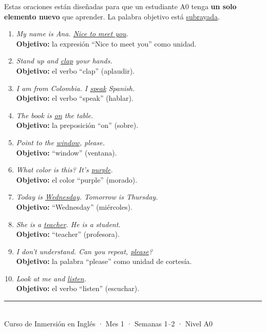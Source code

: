 \documentclass[12pt,a4paper]{article}
\begin{document}
\begin{cajamineria}
Estas oraciones están diseñadas para que un estudiante A0 tenga \textbf{un solo elemento nuevo} que aprender. La palabra objetivo está \underline{subrayada}.

\medskip
\begin{enumerate}[leftmargin=1.2cm]
  \item \textit{My name is Ana. \underline{Nice to meet you}.}\\
    {\small\textbf{Objetivo:} la expresión ``Nice to meet you'' como unidad.}

  \item \textit{Stand up and \underline{clap} your hands.}\\
    {\small\textbf{Objetivo:} el verbo ``clap'' (aplaudir).}

  \item \textit{I am from Colombia. I \underline{speak} Spanish.}\\
    {\small\textbf{Objetivo:} el verbo ``speak'' (hablar).}

  \item \textit{The book is \underline{on} the table.}\\
    {\small\textbf{Objetivo:} la preposición ``on'' (sobre).}

  \item \textit{Point to the \underline{window}, please.}\\
    {\small\textbf{Objetivo:} ``window'' (ventana).}

  \item \textit{What color is this? It's \underline{purple}.}\\
    {\small\textbf{Objetivo:} el color ``purple'' (morado).}

  \item \textit{Today is \underline{Wednesday}. Tomorrow is Thursday.}\\
    {\small\textbf{Objetivo:} ``Wednesday'' (miércoles).}

  \item \textit{She is a \underline{teacher}. He is a student.}\\
    {\small\textbf{Objetivo:} ``teacher'' (profesora).}

  \item \textit{I don't understand. Can you repeat, \underline{please}?}\\
    {\small\textbf{Objetivo:} la palabra ``please'' como unidad de cortesía.}

  \item \textit{Look at me and \underline{listen}.}\\
    {\small\textbf{Objetivo:} el verbo ``listen'' (escuchar).}
\end{enumerate}
\end{cajamineria}

\vfill
\begin{center}
\rule{0.5\textwidth}{0.5pt}\\[0.3cm]
{\small\color{grissuave} Curso de Inmersión en Inglés · Mes 1 · Semanas 1--2 · Nivel A0}
\end{center}
\end{document}

